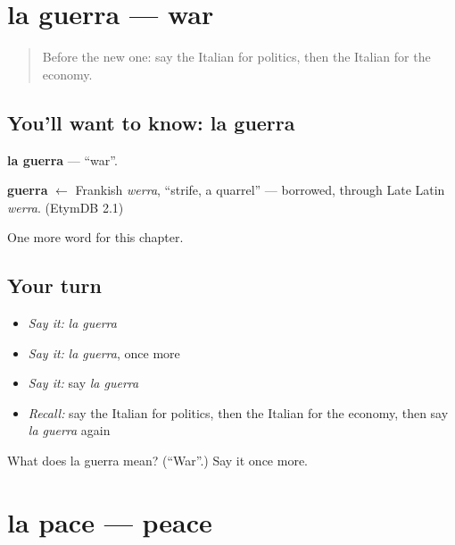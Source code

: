 \section[la guerra]{la guerra — war}

\label{lesson:IT-C193-guerra}



\begin{quote}
Before the new one: say the Italian for politics, then the Italian for the economy.
\end{quote}

\subsection*{You'll want to know: la guerra}
\textbf{la guerra} — \textquotedblleft{}war\textquotedblright{}.

\begin{cousinweb}
\textbf{guerra} $\leftarrow$ Frankish \emph{werra}, \textquotedblleft{}strife, a quarrel\textquotedblright{} — borrowed, through Late Latin \emph{werra}. (EtymDB 2.1)
\end{cousinweb}

\begin{grammarlens}[title={What you've built}]
One more word for this chapter.
\end{grammarlens}

\subsection*{Your turn}
\begin{itemize}
\raggedright
  \item \emph{Say it:} \emph{la guerra}
  \item \emph{Say it:} \emph{la guerra}, once more
  \item \emph{Say it:} say \emph{la guerra}
  \item \emph{Recall:} say the Italian for politics, then the Italian for the economy, then say \emph{la guerra} again
\end{itemize}

\begin{tcolorbox}[breakable,colback=teal!4,colframe=teal!35!black,title={Before you move on}]
What does la guerra mean? (\textquotedblleft{}War\textquotedblright{}.) Say it once more.
\end{tcolorbox}
\section[la pace]{la pace — peace}

